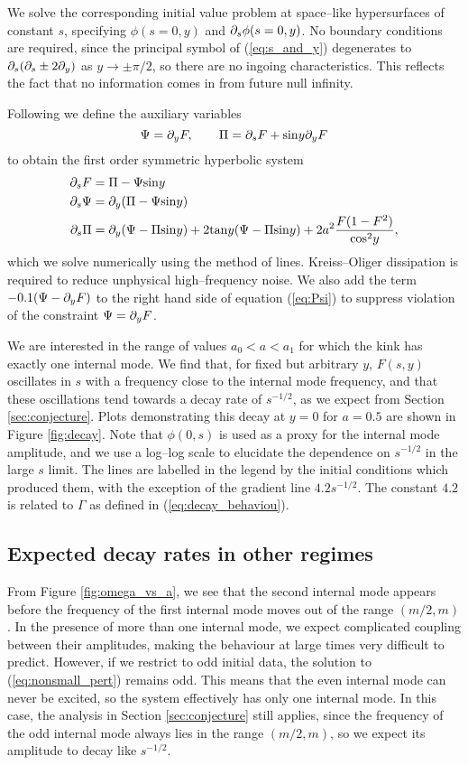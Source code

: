 We solve the corresponding initial value problem at space--like hypersurfaces of constant $s$, specifying $\phi(s=0,y)$ and $\partial_s\phi(s=0,y)$. No boundary conditions are required, since the principal symbol of (\ref{eq:s_and_y}) degenerates to $\partial_s(\partial_s\pm 2\partial_y)$ as $y\rightarrow\pm \pi/2$, so there are no ingoing characteristics. This reflects the fact that no information comes in from future null infinity.

Following \cite{wavemaps, sym_hyp} we define the auxiliary variables
\[
\Psi = \partial_yF, \qquad \Pi = \partial_sF + \mathrm{sin}y\partial_yF
\]
to obtain the first order symmetric hyperbolic system
\begin{align}
\partial_sF &= \Pi - \Psi\mathrm{sin}y \\
\label{eq:Psi} \partial_s\Psi &= \partial_y(\Pi-\Psi\mathrm{sin}y) \\
\partial_s\Pi &= \partial_y(\Psi-\Pi\mathrm{sin}y) + 2\mathrm{tan}y(\Psi-\Pi\mathrm{sin}y) + 2a^2\frac{F(1-F^2)}{\mathrm{cos}^2y},
\end{align}
which we solve numerically using the method of lines. Kreiss--Oliger dissipation is required to reduce unphysical high--frequency noise. We also add the term $-0.1(\Psi-\partial_yF)$ to the right hand side of equation (\ref{eq:Psi}) to suppress violation of the constraint $\Psi=\partial_yF$.

We are interested in the range of values $a_0<a<a_1$ for which the kink has exactly one internal mode. We find that, for fixed but arbitrary $y$, $F(s,y)$ oscillates in $s$ with a frequency close to the internal mode frequency, and that these oscillations tend towards a decay rate of $s^{-1/2}$, as we expect from Section \ref{sec:conjecture}. Plots demonstrating this decay at $y=0$ for $a=0.5$ are shown in Figure \ref{fig:decay}. Note that $\phi(0,s)$ is used as a proxy for the internal mode amplitude, and we use a log--log scale to elucidate the dependence on $s^{-1/2}$ in the large $s$ limit. The lines are labelled in the legend by the initial conditions which produced them, with the exception of the gradient line $4.2s^{-1/2}$. The constant $4.2$ is related to $\Gamma$ as defined in (\ref{eq:decay_behaviou}).

\subsection{Expected decay rates in other regimes}
From Figure \ref{fig:omega_vs_a}, we see that the second internal mode appears before the frequency of the first internal mode moves out of the range $(m/2,m)$. In the presence of more than one internal mode, we expect complicated coupling between their amplitudes, making the behaviour at large times very difficult to predict. However, if we restrict to odd initial data, the solution to (\ref{eq:nonsmall_pert}) remains odd. This means that the even internal mode can never be excited, so the system effectively has only one internal mode. In this case, the analysis in Section \ref{sec:conjecture} still applies, since the frequency of the odd internal mode always lies in the range $(m/2,m)$, so we expect its amplitude to decay like $s^{-1/2}$.

